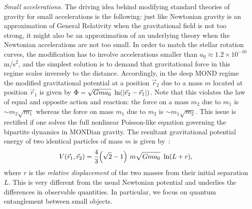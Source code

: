 \documentclass[aps,prl,reprint,superscriptaddress,nofootinbib,floatfix]{revtex4-2}
\begin{document}
\emph{Small accelerations.}
The driving idea behind modifying standard theories of gravity for small accelerations is the following: just like Newtonian gravity is an approximation of General Relativity when the gravitational field is not too strong, it might also be an approximation of an underlying theory when the Newtonian accelerations are not too small.
In order to match the stellar rotation curves, the modification has to involve accelerations smaller than $a_0 \approx 1.2 \times 10^{-10}$ m/s$^2$, and the simplest solution is to demand that gravitational force in this regime scales inversely to the distance.
Accordingly, in the deep MOND regime the modified gravitational potential at a position $\vec r_2$ due to a mass $m$ located at position $\vec r_1$ is given by $\Phi = \sqrt{Gma_0} \ \ln( \abs{\vec r_2 - \vec r_1})$. 
Note that this violates the law of equal and opposite action and reaction: the force on a mass $m_2$ due to $m_1$ is $\sim m_2\sqrt{m_1}$ whereas the force on mass $m_1$ due to $m_2$ is $\sim m_1\sqrt{m_2}$.
This issue is rectified if one solves the full nonlinear Poisson-like equation governing the bipartite dynamics in MONDian gravity.
The resultant gravitational potential energy of two identical particles of mass $m$ is given by~\cite{MOND2Body-Milgrom2014,MOND2Body-Zhao2010,MOND2Body-Milgrom1986}:
\begin{equation}
V(\vec r_1, \vec r_2) =  \frac{4}{3} \qty( \sqrt{2} - 1 ) \ m \sqrt{G m a_0} \ \ln(L+r) ,
\label{eq:ForceIdenticalMasses}    
\end{equation}
where $r$ is the \emph{relative displacement} of the two masses from their initial separation $L$.
This is very different from the usual Newtonian potential and underlies the differences in observable quantities.
In particular, we focus on quantum entanglement between small objects.
\end{document}
